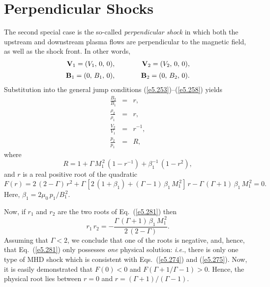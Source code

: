 \section{Perpendicular Shocks}\label{sperp}
The second special case is the so-called {\em perpendicular shock}\/ in which both the
upstream and downstream plasma flows are  perpendicular to the magnetic field, as well as   the shock
front. In other
words,
\begin{eqnarray}\label{e5.274}
{\bf V}_1 = (V_1,\,0,\,0),&\mbox{\hspace{1cm}}&{\bf V}_2 = (V_2,\,0,\,0),\\[0.5ex]\label{e5.275}
{\bf B}_1 = (0,\,B_1,\,0),&\mbox{\hspace{1cm}}&{\bf B}_2 = (0,\,B_2,\,0).
\end{eqnarray}
Substitution  into the general jump conditions (\ref{e5.253})--(\ref{e5.258}) yields
\begin{eqnarray}
\frac{B_2}{B_1} &=& r,\label{e5.276}\\[0.5ex]
\frac{\rho_2}{\rho_1} &=& r,\\[0.5ex]
\frac{V_2}{V_1}&=& r^{-1},\\[0.5ex]
\frac{p_2}{p_1} &=& R,
\end{eqnarray}
where
\begin{equation}\label{e5.280}
R = 1+ \Gamma\,M_1^{\,2}\,(1-r^{-1}) + \beta_1^{-1}\,(1-r^2),
\end{equation}
and $r$ is a real positive root of the quadratic
\begin{equation}\label{e5.281}
F(r) = 2\,(2-\Gamma)\,r^2+ \Gamma\,[2\,(1+\beta_1)+ (\Gamma-1)\,\beta_1\,M_1^{\,2}] \,r- \Gamma\,(\Gamma+1)\,\beta_1\,M_1^{\,2}=0.
\end{equation}
Here, $\beta_1= 2\mu_0\,p_1/B_1^{\,2}$. 

Now, if $r_1$ and $r_2$ are the two roots of Eq.~(\ref{e5.281}) then
\begin{equation}
r_1\,r_2= -\frac{\Gamma\,(\Gamma+1)\,\beta_1\,M_1^{\,2}}{2\,(2-\Gamma)}.
\end{equation}
Assuming that $\Gamma < 2$, we conclude that one of the roots is negative,
and, hence, that Eq.~(\ref{e5.281}) only possesses {\em one}\/ physical
solution: {\em i.e.}, there is only one type of MHD shock which is
consistent with Eqs.~(\ref{e5.274}) and (\ref{e5.275}). Now, it is easily
demonstrated that $F(0)<0$ and $F(\Gamma+1/\Gamma-1)>0$. Hence, the
physical root lies between $r=0$ and $r=(\Gamma+1)/(\Gamma-1)$. 

